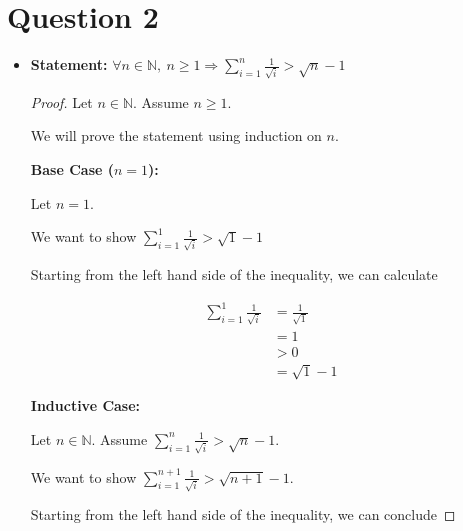 \documentclass[12pt]{article}
\begin{document}
\section*{Question 2}
\begin{itemize}
    \item
    \textbf{Statement:} $\forall n \in \mathbb{N},\:n \geq 1 \Rightarrow
    \sum\limits_{i=1}^{n} \frac{1}{\sqrt{i}} > \sqrt{n} - 1$

    \bigskip

    \begin{proof}

        Let $n \in \mathbb{N}$. Assume $n \geq 1$.

        \bigskip

        We will prove the statement using induction on $n$.

        \bigskip

        \textbf{Base Case ($n = 1$):}

        \bigskip

        Let $n = 1$.

        \bigskip

        We want to show $\sum\limits_{i=1}^1 \frac{1}{\sqrt{i}} > \sqrt{1} - 1$

        \bigskip

        Starting from the left hand side of the inequality, we can calculate

        \setcounter{equation}{0}
        \begin{align}
            \sum\limits_{i=1}^1 \frac{1}{\sqrt{i}} &= \frac{1}{\sqrt{1}}\\
            &= 1\\
            &> 0\\
            &= \sqrt{1} - 1
        \end{align}

        \bigskip

        \textbf{Inductive Case:}

        \bigskip

        Let $n \in \mathbb{N}$. Assume $\sum\limits_{i=1}^{n} \frac{1}{\sqrt{i}} > \sqrt{n} - 1$.

        \bigskip

        We want to show $\sum\limits_{i=1}^{n+1} \frac{1}{\sqrt{i}} > \sqrt{n+1} - 1$.

        \bigskip

        Starting from the left hand side of the inequality, we can conclude


\end{proof}
\end{itemize}
\end{document}
